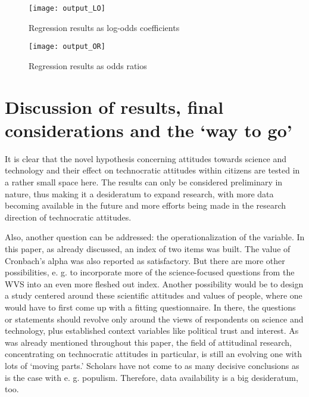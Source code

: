 \documentclass[
  12pt,
  english,
]{article}
\begin{document}
\begin{figure}

{\centering \texttt{[image: output\_LO]} 

}

\caption{Regression results as log-odds coefficients}\label{fig:insert graphics: LO table}
\end{figure}

\begin{figure}

{\centering \texttt{[image: output\_OR]} 

}

\caption{Regression results as odds ratios}\label{fig:insert graphics: OR table}
\end{figure}

\newpage{}

\hypertarget{discussion-of-results-final-considerations-and-the-way-to-go}{%
\section{Discussion of results, final considerations and the `way to
go'}\label{discussion-of-results-final-considerations-and-the-way-to-go}}

It is clear that the novel hypothesis concerning attitudes towards
science and technology and their effect on technocratic attitudes within
citizens are tested in a rather small space here. The results can only
be considered preliminary in nature, thus making it a desideratum to
expand research, with more data becoming available in the future and
more efforts being made in the research direction of technocratic
attitudes.

Also, another question can be addressed: the operationalization of the
variable. In this paper, as already discussed, an index of two items was
built. The value of Cronbach's alpha was also reported as satisfactory.
But there are more other possibilities, e. g. to incorporate more of the
science-focused questions from the WVS into an even more fleshed out
index. Another possibility would be to design a study centered around
these scientific attitudes and values of people, where one would have to
first come up with a fitting questionnaire. In there, the questions or
statements should revolve only around the views of respondents on
science and technology, plus established context variables like
political trust and interest. As was already mentioned throughout this
paper, the field of attitudinal research, concentrating on technocratic
attitudes in particular, is still an evolving one with lots of `moving
parts.' Scholars have not come to as many decisive conclusions as is the
case with e. g. populism. Therefore, data availability is a big
desideratum, too.
\end{document}
